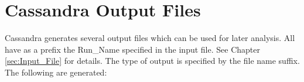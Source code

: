 
\section{Cassandra Output Files}

Cassandra generates several output files which can be used for later analysis. All have as a prefix the Run\_Name specified in the input file. See Chapter \ref{sec:Input_File} for details. The type of output is specified by the file name suffix. The following are generated:

